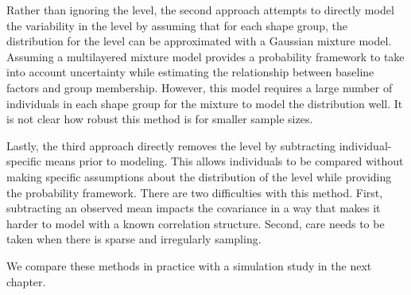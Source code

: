 Rather than ignoring the level, the second approach attempts to directly model the variability in the level by assuming that for each shape group, the distribution for the level can be approximated with a Gaussian mixture model. Assuming a multilayered mixture model provides a probability framework to take into account uncertainty while estimating the relationship between baseline factors and group membership. However, this model requires a large number of individuals in each shape group for the mixture to model the distribution well. It is not clear how robust this method is for smaller sample sizes.

Lastly, the third approach directly removes the level by subtracting individual-specific means prior to modeling. This allows individuals to be compared without making specific assumptions about the distribution of the level while providing the probability framework.  There are two difficulties with this method. First, subtracting an observed mean impacts the covariance in a way that makes it harder to model with a known correlation structure. Second, care needs to be taken when there is sparse and irregularly sampling. 

We compare these methods in practice with a simulation study in the next chapter.
